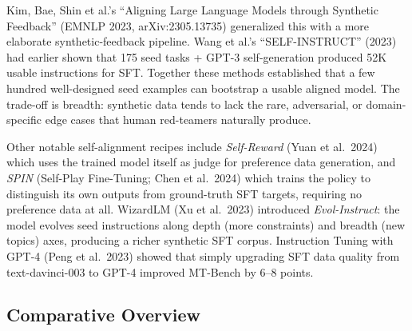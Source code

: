 \documentclass{article}
\begin{document}
Kim, Bae, Shin et al.'s ``Aligning Large Language Models through Synthetic Feedback'' (EMNLP 2023, arXiv:2305.13735) generalized this with a more elaborate synthetic-feedback pipeline. Wang et al.'s ``SELF-INSTRUCT'' (2023) had earlier shown that 175 seed tasks + GPT-3 self-generation produced 52K usable instructions for SFT. Together these methods established that a few hundred well-designed seed examples can bootstrap a usable aligned model. The trade-off is breadth: synthetic data tends to lack the rare, adversarial, or domain-specific edge cases that human red-teamers naturally produce.

Other notable self-alignment recipes include \emph{Self-Reward} (Yuan et al.~2024) which uses the trained model itself as judge for preference data generation, and \emph{SPIN} (Self-Play Fine-Tuning; Chen et al.~2024) which trains the policy to distinguish its own outputs from ground-truth SFT targets, requiring no preference data at all. WizardLM (Xu et al.~2023) introduced \emph{Evol-Instruct}: the model evolves seed instructions along depth (more constraints) and breadth (new topics) axes, producing a richer synthetic SFT corpus. Instruction Tuning with GPT-4 (Peng et al.~2023) showed that simply upgrading SFT data quality from text-davinci-003 to GPT-4 improved MT-Bench by 6--8 points.

\subsection{Comparative Overview}\label{comparative-overview}
\end{document}
